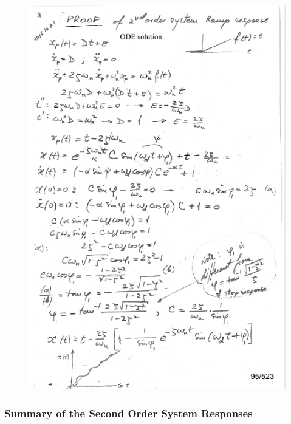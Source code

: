 \documentclass[12pt,letter]{article}
\begin{document}
\begin{mdframed}[middlelinewidth=0.5mm]
	\begin{center}
	\end{center}
	
	\begin{figure}[H]
		\centering
		\includegraphics[width=5.5in]{../figures/x_t_time_response_2nd_order_ramp_proof_1}
	\end{figure}
\end{mdframed}

\subsubsection{Summary of the Second Order System Responses}
\end{document}
